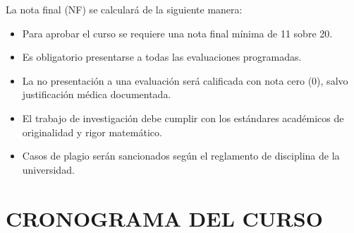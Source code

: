 \documentclass[12pt,a4paper]{article}
\begin{document}
La nota final (NF) se calculará de la siguiente manera:


\begin{tcolorbox}[colback=pucpRojo!5,colframe=pucpRojo,title=\textbf{Políticas de Evaluación}]
\begin{itemize}[leftmargin=*]
    \item Para aprobar el curso se requiere una nota final mínima de 11 sobre 20.
    \item Es obligatorio presentarse a todas las evaluaciones programadas.
    \item La no presentación a una evaluación será calificada con nota cero (0), salvo justificación médica documentada.
    \item El trabajo de investigación debe cumplir con los estándares académicos de originalidad y rigor matemático.
    \item Casos de plagio serán sancionados según el reglamento de disciplina de la universidad.
\end{itemize}
\end{tcolorbox}
\vspace{0.5cm}

\section{CRONOGRAMA DEL CURSO}
\end{document}
